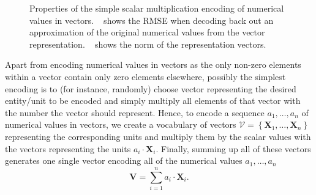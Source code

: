 \begin{figure}[t]
    \centering
    \caption{Properties of the simple scalar multiplication encoding of numerical values in vectors. ~\protect{} shows the \ac{RMSE} when decoding back out an approximation of the original numerical values from the vector representation. ~\protect{} shows the norm of the representation vectors.}
    \label{fig:scalar_multiplication_encoding}
\end{figure}
Apart from encoding numerical values in vectors as the only non-zero elements within a vector contain only zero elements elsewhere, possibly the simplest encoding is to (for instance, randomly) choose vector representing the desired entity/unit to be encoded and simply multiply all elements of that vector with the number the vector should represent.
Hence, to encode a sequence $a_{1}, \ldots, a_{n}$ of numerical values in vectors, we create a vocabulary of vectors $\mathcal{V}=\left\{ \mathbf{X}_{1}, \ldots, \mathbf{X}_{n} \right\}$ representing the corresponding units and multiply them by the scalar values with the vectors representing the units $a_{i}\cdot \mathbf{X}_{i}$.
Finally, summing up all of these vectors generates one single vector encoding all of the numerical values $a_{1}, \ldots, a_{n}$ 
\begin{equation}
\label{eq:scalar_mult_encoding}
\mathbf{V} = \sum\limits_{i=1}^{n} a_{i}\cdot \mathbf{X}_{i}. 
\end{equation}

